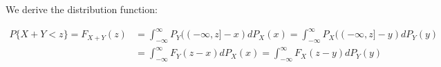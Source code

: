 We derive the distribution function:

\begin{align*}
P\{X+Y < z\} = F_{X+Y}(z) &= \int_{-\infty}^{\infty} P_Y((-\infty, z] - x) dP_X(x) = \int_{-\infty}^{\infty} P_X((-\infty, z] - y) dP_Y(y) \\
&= \int_{-\infty}^{\infty} F_Y(z - x) dP_X(x) = \int_{-\infty}^{\infty} F_X(z - y) dP_Y(y)
\end{align*}



